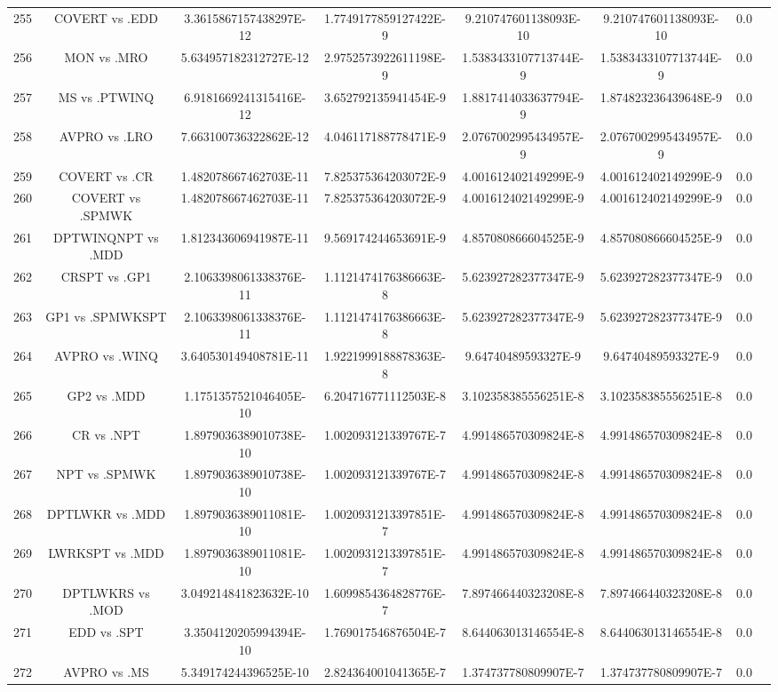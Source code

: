 \documentclass[a3paper,10pt]{article}
\begin{document}
\begin{table}[!htp]
\begin{tabular}{cccccccc}
255&COVERT vs .EDD&3.3615867157438297E-12&1.7749177859127422E-9&9.210747601138093E-10&9.210747601138093E-10&0.0\\
256&MON vs .MRO&5.634957182312727E-12&2.9752573922611198E-9&1.5383433107713744E-9&1.5383433107713744E-9&0.0\\
257&MS vs .PTWINQ&6.9181669241315416E-12&3.652792135941454E-9&1.8817414033637794E-9&1.874823236439648E-9&0.0\\
258&AVPRO vs .LRO&7.663100736322862E-12&4.046117188778471E-9&2.0767002995434957E-9&2.0767002995434957E-9&0.0\\
259&COVERT vs .CR&1.482078667462703E-11&7.825375364203072E-9&4.001612402149299E-9&4.001612402149299E-9&0.0\\
260&COVERT vs .SPMWK&1.482078667462703E-11&7.825375364203072E-9&4.001612402149299E-9&4.001612402149299E-9&0.0\\
261&DPTWINQNPT vs .MDD&1.812343606941987E-11&9.569174244653691E-9&4.857080866604525E-9&4.857080866604525E-9&0.0\\
262&CRSPT vs .GP1&2.1063398061338376E-11&1.1121474176386663E-8&5.623927282377347E-9&5.623927282377347E-9&0.0\\
263&GP1 vs .SPMWKSPT&2.1063398061338376E-11&1.1121474176386663E-8&5.623927282377347E-9&5.623927282377347E-9&0.0\\
264&AVPRO vs .WINQ&3.640530149408781E-11&1.9221999188878363E-8&9.64740489593327E-9&9.64740489593327E-9&0.0\\
265&GP2 vs .MDD&1.1751357521046405E-10&6.204716771112503E-8&3.102358385556251E-8&3.102358385556251E-8&0.0\\
266&CR vs .NPT&1.8979036389010738E-10&1.002093121339767E-7&4.991486570309824E-8&4.991486570309824E-8&0.0\\
267&NPT vs .SPMWK&1.8979036389010738E-10&1.002093121339767E-7&4.991486570309824E-8&4.991486570309824E-8&0.0\\
268&DPTLWKR vs .MDD&1.8979036389011081E-10&1.0020931213397851E-7&4.991486570309824E-8&4.991486570309824E-8&0.0\\
269&LWRKSPT vs .MDD&1.8979036389011081E-10&1.0020931213397851E-7&4.991486570309824E-8&4.991486570309824E-8&0.0\\
270&DPTLWKRS vs .MOD&3.049214841823632E-10&1.6099854364828776E-7&7.897466440323208E-8&7.897466440323208E-8&0.0\\
271&EDD vs .SPT&3.3504120205994394E-10&1.769017546876504E-7&8.644063013146554E-8&8.644063013146554E-8&0.0\\
272&AVPRO vs .MS&5.349174244396525E-10&2.824364001041365E-7&1.374737780809907E-7&1.374737780809907E-7&0.0\\

\end{tabular}
\end{table}
\end{document}
